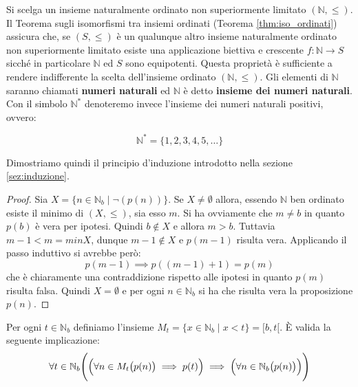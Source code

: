 Si scelga un insieme naturalmente ordinato non superiormente limitato $(\mathbb{N},\leq)$. Il Teorema sugli isomorfismi tra insiemi ordinati (Teorema \ref{thm:iso_ordinati}) assicura che, se $(S,\leq)$ è un qualunque altro insieme naturalmente ordinato non superiormente limitato esiste una applicazione biettiva e crescente $f:\mathbb{N}\rightarrow S$ sicché in particolare $\mathbb{N}$ ed $S$ sono equipotenti. Questa proprietà è sufficiente a rendere indifferente la scelta dell'insieme ordinato $(\mathbb{N},\leq)$. Gli elementi di $\mathbb{N}$ saranno chiamati \textbf{numeri naturali} ed $\mathbb{N}$ è detto \textbf{insieme dei numeri naturali}. Con il simbolo $\mathbb{N}^{*}$ denoteremo invece l'insieme dei numeri naturali positivi, ovvero:

\begin{displaymath}
	\mathbb{N}^{*} = \{1,2,3,4,5, \ldots\}
\end{displaymath}

Dimostriamo quindi il principio d'induzione introdotto nella sezione \ref{sez:induzione}. 
\begin{proof}
	Sia $X = \{n \in \mathbb{N}_{b} \; | \; \neg (p(n))\}$. Se $X \neq \emptyset$ allora, essendo $\mathbb{N}$ ben ordinato esiste il minimo di $(X,\leq)$, sia esso $m$. Si ha ovviamente che $m \neq b$ in quanto $p(b)$ è vera per ipotesi. Quindi $b \notin X$ e allora $m>b$. Tuttavia $m-1<m = min X$, dunque $m-1 \notin X$ e $p(m-1)$ risulta vera. Applicando il passo induttivo si avrebbe però:
	\begin{displaymath}
		p(m-1) \implies p((m-1)+1) = p(m)
	\end{displaymath} che è chiaramente una contraddizione rispetto alle ipotesi in quanto $p(m)$ risulta falsa. Quindi $X = \emptyset$ e per ogni $n \in \mathbb{N}_{b}$ si ha che risulta vera la proposizione $p(n)$.
\end{proof}

\begin{propbox}
	Per ogni $t \in \mathbb{N}_{b}$ definiamo l'insieme $M_{t}= \{x \in \mathbb{N}_{b} \; | \; x < t \} = [b,t[$. È valida la seguente implicazione:
	\begin{displaymath}
		\forall t \in \mathbb{N}_{b} \Biggl(\Bigl(\forall n \in M_{t} \bigl(p(n)\bigr) \implies p(t)\Bigr) \implies \Bigl(\forall n \in \mathbb{N}_{b}\bigl(p(n)\bigr)\Bigr)\Biggr)
	\end{displaymath}
\end{propbox}


